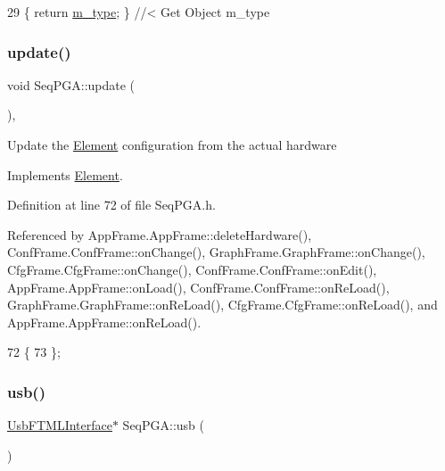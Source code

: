 \begin{DoxyCode}
29 \{ \textcolor{keywordflow}{return} \hyperlink{classObject_a457a600fe8c00eb1034374f75110a78c}{m\_type};       \} \textcolor{comment}{//< Get Object m\_type}
\end{DoxyCode}
\mbox{\label{classSeqPGA_a0003d286a27a82024d84b392edab2c3b}} 
\subsubsection{\texorpdfstring{update()}{update()}}
{\footnotesize\ttfamily void Seq\+P\+G\+A\+::update (\begin{DoxyParamCaption}{ }\end{DoxyParamCaption})\hspace{0.3cm}{\ttfamily [inline]}, {\ttfamily [virtual]}}

Update the \hyperlink{classElement}{Element} configuration from the actual hardware 

Implements \hyperlink{classElement_a4e6c83efae95616ebddd03c793a26661}{Element}.



Definition at line 72 of file Seq\+P\+G\+A.\+h.



Referenced by App\+Frame.\+App\+Frame\+::delete\+Hardware(), Conf\+Frame.\+Conf\+Frame\+::on\+Change(), Graph\+Frame.\+Graph\+Frame\+::on\+Change(), Cfg\+Frame.\+Cfg\+Frame\+::on\+Change(), Conf\+Frame.\+Conf\+Frame\+::on\+Edit(), App\+Frame.\+App\+Frame\+::on\+Load(), Conf\+Frame.\+Conf\+Frame\+::on\+Re\+Load(), Graph\+Frame.\+Graph\+Frame\+::on\+Re\+Load(), Cfg\+Frame.\+Cfg\+Frame\+::on\+Re\+Load(), and App\+Frame.\+App\+Frame\+::on\+Re\+Load().


\begin{DoxyCode}
72                  \{
73   \};
\end{DoxyCode}
\mbox{\label{classSeqPGA_a10c68ea9de38eb0445d47e4b21b580a1}} 
\subsubsection{\texorpdfstring{usb()}{usb()}}
{\footnotesize\ttfamily \hyperlink{classUsbFTMLInterface}{Usb\+F\+T\+M\+L\+Interface}$\ast$ Seq\+P\+G\+A\+::usb (\begin{DoxyParamCaption}{ }\end{DoxyParamCaption})\hspace{0.3cm}{\ttfamily [inline]}}



